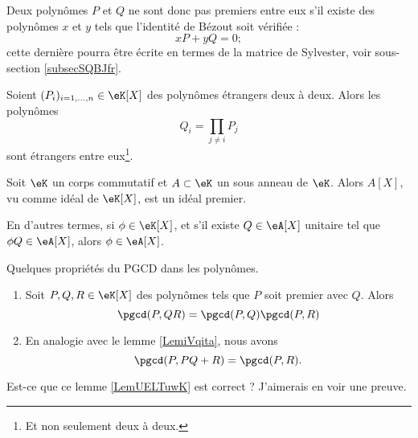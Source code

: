Deux polynômes \( P\) et \( Q\) ne sont donc pas premiers entre eux s'il existe des polynômes \( x\) et \( y\) tels que l'identité de Bézout soit vérifiée :
\begin{equation}    \label{EqkbbzAi}
    xP+yQ=0;
\end{equation}
cette dernière pourra être écrite en termes de la matrice de Sylvester, voir sous-section \ref{subsecSQBJfr}.

\begin{lemma}       \label{LemuALZHn}
    Soient \( (P_i)_{i=1,\ldots,n}\in \eK[X]\) des polynômes étrangers deux à deux. Alors les polynômes \begin{equation} Q_i=\prod_{j\neq i}P_j \end{equation}
    sont étrangers entre eux\footnote{Et non seulement deux à deux.}.
\end{lemma}

\begin{lemma}   \label{LemzwkYdn}
    Soit \( \eK\) un corps commutatif et \( A\subset \eK\) un sous
    anneau de \( \eK\).  Alors \( A[X] \), vu comme idéal de \( \eK[X]
    \), est un idéal premier.

    En d'autres termes, si \( \phi\in \eK[X]\), et s'il existe \( Q\in \eA[X]\) unitaire tel que \( \phi Q\in \eA[X]\), alors \( \phi\in \eA[X]\).
\end{lemma}



\begin{lemma}   \label{LemUELTuwK}
    Quelques propriétés du PGCD dans les polynômes.
    \begin{enumerate}
        \item
            Soit \( P,Q,R\in \eK[X]\) des polynômes tels que \( P\) soit premier avec \( Q\). Alors
            \begin{equation}
                \pgcd(P,QR)=\pgcd(P,Q)\pgcd(P,R)
            \end{equation}
        \item
            En analogie avec le lemme \ref{LemiVqita}, nous avons
            \begin{equation}
                \pgcd(P,PQ+R)=\pgcd(P,R).
            \end{equation}
    \end{enumerate}
\end{lemma}
\begin{probleme}
    Est-ce que ce lemme \ref{LemUELTuwK} est correct ? J'aimerais en voir une preuve.
\end{probleme}

